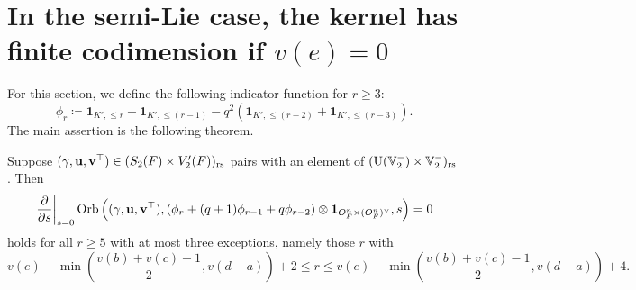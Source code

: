 \section{In the semi-Lie case, the kernel has finite codimension if $v(e)=0$}
For this section, we define the following indicator function for $r \ge 3$:
\[ \phi_r \coloneqq \mathbf{1}_{K', \le r} + \mathbf{1}_{K', \le (r-1)}
   - q^2 (\mathbf{1}_{K', \le (r-2)} + \mathbf{1}_{K', \le (r-3)}). \]
The main assertion is the following theorem.
\begin{theorem}
  \label{thm:semi_lie_finite_codim_full}
  Suppose ${(\gamma, \mathbf u, \mathbf v^\top)} \in (S_2(F) \times V_2'(F))_{\mathrm{rs}}$
  pairs with an element of $(\operatorname{U}(\mathbb V_2^-) \times \mathbb V_2^-)_{\mathrm{rs}}$.
  Then
  \[
    \left. \pdv{}{s} \right\rvert_{s=0}
    \operatorname{Orb} \left( {(\gamma, \mathbf u, \mathbf v^\top)}, (\phi_r + (q+1)\phi_{r-1} + q\phi_{r-2}) \otimes \mathbf{1}_{O_F^n \times (O_F^n)^\vee}, s \right) = 0
  \]
  holds for all $r \ge 5$ with at most three exceptions,
  namely those $r$ with
  \[ v(e) - \min\left(\frac{v(b)+v(c)-1}{2}, v(d-a)\right) + 2
    \le r \le v(e) - \min\left(\frac{v(b)+v(c)-1}{2}, v(d-a)\right) + 4. \]
\end{theorem}
